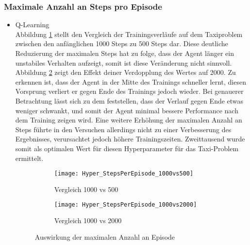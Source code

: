 \subsubsection{Maximale Anzahl an Steps pro Episode}
\begin{itemize}
    \item Q-Learning\\
    Abbildung \ref{fig:MaxStepCount_1000vs500} stellt den Vergleich der Trainingsverläufe auf dem Taxiproblem zwischen den anfänglichen 1000 Steps zu 500 Steps dar.
    Diese deutliche Reduzierung der maximalen Steps hat zu folge, dass der Agent länger ein unstabiles Verhalten aufzeigt, somit ist diese Veränderung nicht sinnvoll.
    Abbildung \ref{fig:MaxStepCount_1000vs2000} zeigt den Effekt deiner Verdopplung des Wertes auf 2000. Zu erkennen ist, dass der Agent in der Mitte des Trainings schneller lernt, diesen Vorsprung verliert er gegen Ende des Trainings jedoch wieder.
    Bei genauerer Betrachtung lässt sich zu dem feststellen, dass der Verlauf gegen Ende etwas weniger schwankt, und somit der Agent minimal bessere Performance nach dem Training zeigen wird. 
    Eine weitere Erhöhung der maximalen Anzahl an Steps führte in den Versuchen allerdings nicht zu einer Verbesserung des Ergebnisses, verursachtet jedoch höhere Trainingszeiten.
    Zweittausend wurde somit als optimalen Wert für diesen Hyperparameter für das Taxi-Problem ermittelt. 

    \begin{figure}[H]
        \centering
        \begin{subfigure}{.5\textwidth}
          \centering
          \texttt{[image: Hyper\_StepsPerEpisode\_1000vs500]}
          \caption{Vergleich 1000 vs 500}
          \label{fig:MaxStepCount_1000vs500}
        \end{subfigure}%
        \begin{subfigure}{.5\textwidth}
          \centering
          \texttt{[image: Hyper\_StepsPerEpisode\_1000vs2000]}
          \caption{Vergleich 1000 vs 2000}
          \label{fig:MaxStepCount_1000vs2000}
        \end{subfigure}
        \caption{Auswirkung der maximalen Anzahl an Episode}
        \label{fig:MaxStepCount}
    \end{figure}


\end{itemize}
